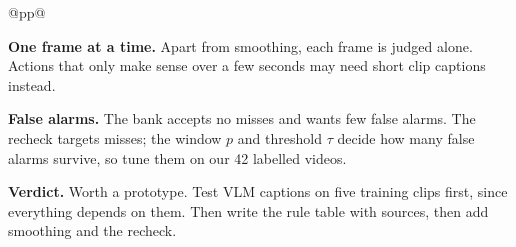 \documentclass[10pt]{article}
\newlength{\papercolw}\setlength{\papercolw}{5.0cm}
\newlength{\desccolw}\setlength{\desccolw}{\dimexpr\textwidth-\papercolw-2\tabcolsep\relax}
\newcommand{\rowhead}[2]{{\small\bfseries\color{muted}#1\quad\color{ink}#2}\par\vspace{5pt}}
\newcommand{\textcol}[2]{\begin{minipage}[t]{#1}\small\raggedright #2\end{minipage}}
\begin{document}
\begin{longtable}{@{}p{\papercolw}p{\desccolw}@{}}
\begin{minipage}[t]{\linewidth}
\textcol{10.6cm}{\textbf{One frame at a time.} Apart from smoothing, each frame is judged alone.
Actions that only make sense over a few seconds may need short clip captions instead.\par\vspace{4pt}
\textbf{False alarms.} The bank accepts no misses and wants few false alarms. The recheck targets
misses; the window $p$ and threshold $\tau$ decide how many false alarms survive, so tune them on our
42 labelled videos.}
\par\vspace{8pt}
{\small\textbf{Verdict.} Worth a prototype. Test VLM captions on five training clips first, since
everything depends on them. Then write the rule table with sources, then add smoothing and the recheck.}
\end{minipage}
\\[8pt]


\end{longtable}
\end{document}
